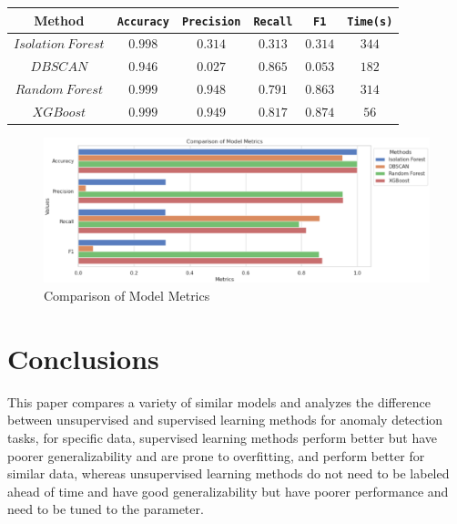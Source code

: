 \begin{center}
	\begin{tabular}{c| c c c c c }
		\toprule
		Method & \texttt{Accuracy}  & \texttt{Precision} & \texttt{Recall}  & \texttt{F1}  & \texttt{Time(s)}\\
		\midrule
		$Isolation\ Forest$
		&  {$0.998$} &  {$0.314$} & {$0.313$} & {$0.314$}  & {$344$} \\
		$DBSCAN$
		&  {$0.946$} &  {$0.027$} & {$0.865$} & {$0.053$}  & {$182$} \\
		$Random\ Forest$
		&  {$0.999$} &  {$0.948$} & {$0.791$} & {$0.863$}  & {$314$} \\
		$XGBoost$
		&  {$0.999$} &  {$0.949$} & {$0.817$} & {$0.874$}  & {$56$} \\
		\bottomrule
	\end{tabular}
\end{center}

	\begin{figure}[H]
	\centering
	\includegraphics[scale=0.4]{result.eps}
		\caption{Comparison of Model Metrics}\label{fig:OutAspect-target}

\end{figure}



\section{Conclusions} \label{sec-conclusions}
This paper compares a variety of similar models and analyzes the difference between unsupervised and supervised learning methods for anomaly detection tasks, for specific data, supervised learning methods perform better but have poorer generalizability and are prone to overfitting, and perform better for similar data, whereas unsupervised learning methods do not need to be labeled ahead of time and have good generalizability but have poorer performance and need to be tuned to the parameter.

